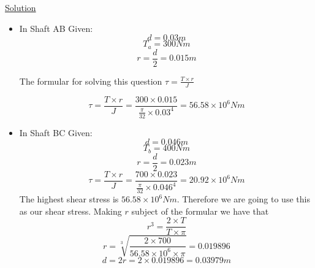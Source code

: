\documentclass{article}
\begin{document}
\begin{center}\underline{Solution}\end{center}
\begin{itemize}
\item  In Shaft AB\newline
Given: \[d = 0.03m\]\[T_{a} = 300Nm\]\[r = \frac{d}{2} = 0.015m\]\newline
\begin{center}The formular for solving this question $\tau = \frac{T\times r}{J}$\end{center}
\[\tau = \frac{T\times r}{J} = \frac{300\times0.015}{\frac{\pi}{32}\times {0.03}^{4}} = 56.58\times10^{6}Nm\]
\item In Shaft BC \newline
Given: \[d = 0.046m\]\[T_{b} = 400Nm\]\[r = \frac{d}{2} = 0.023m\]\newline
\[\tau = \frac{T\times r}{J} = \frac{700\times0.023}{\frac{\pi}{32}\times {0.046}^{4}} = 20.92\times10^{6}Nm\]
The highest shear stress is $ 56.58\times10^{6}Nm$.  Therefore we are going to use this as our shear stress.
Making $r $ subject of the formular we have that \[r^{3} = \frac{2\times T}{T\times\pi}\]
\[r = \sqrt[3]{\frac{2\times700}{56.58\times10^{6}\times\pi}} = 0.019896\]
\[d = 2r = 2\times0.019896 = 0.03979m\]

\end{itemize}


\end{document}
